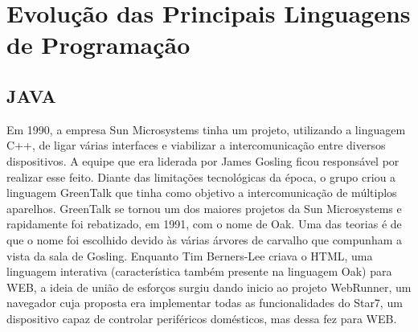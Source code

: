 \documentclass[
    12pt,               %
    openright,          %
    twoside,            %
    a4paper,            %
    brazil              %
    ]{abntex2}
\begin{document}
\frenchspacing 


\imprimircapa

\imprimirfolhaderosto*

\clearpage
{}
\tableofcontents*
\cleardoublepage



\textual

\chapter{Evolução das Principais Linguagens de Programação}

\section{JAVA}

Em 1990, a empresa Sun Microsystems tinha um projeto, utilizando a linguagem
C++, de ligar várias interfaces e viabilizar a intercomunicação entre diversos
dispositivos.  A equipe que era liderada por James Gosling ficou responsável
por realizar esse feito. Diante das limitações tecnológicas da época, o grupo
criou a linguagem GreenTalk que tinha como objetivo a intercomunicação de
múltiplos aparelhos.  GreenTalk se tornou um dos maiores projetos da Sun
Microsystems e rapidamente foi rebatizado, em 1991, com o nome de Oak. Uma das
teorias é de que o nome foi escolhido devido às várias árvores de carvalho que
compunham a vista da sala de Gosling. Enquanto Tim Berners-Lee criava o HTML,
uma linguagem interativa (característica também presente na linguagem Oak) para
WEB, a ideia de união de esforços surgiu dando inicio ao projeto WebRunner, um
navegador cuja proposta era implementar todas as funcionalidades do Star7, um
dispositivo capaz de controlar periféricos domésticos, mas dessa fez para WEB.
\end{document}
